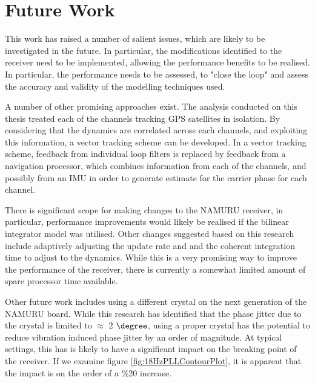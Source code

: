
\section{Future Work}
This work has raised a number of salient issues, which are likely to be investigated in the future. In particular, the modifications identified to the receiver need to be implemented, allowing the performance benefits to be realised. In particular, the performance needs to be assessed, to "close the loop" and assess the accuracy and validity of the modelling techniques used.

A number of other promising approaches exist. The analysis conducted on this thesis treated each of the channels tracking GPS satellites in isolation. By considering that the dynamics are correlated across each channels, and exploiting this information, a vector tracking scheme can be developed. In a vector tracking scheme, feedback from individual loop filters is replaced by feedback from a navigation processor, which combines information from each of the channels, and possibly from an IMU in order to generate estimate for the carrier phase for each channel. 

There is significant scope for making changes to the \ac{NAMURU} receiver, in particular, performance improvements would likely be realised if the bilinear integrator model was utilised. Other changes suggested based on this research include adaptively adjusting the update rate and and the coherent integration time to adjust to the dynamics. While this is a very promising way to improve the performance of the receiver, there is currently a somewhat limited amount of spare processor time available. 

Other future work includes using a different crystal on the next generation of the NAMURU board. While this research has identified that the phase jitter due to the crystal is limited to $\approx$ 2 $\degree$, using a proper crystal has the potential to reduce vibration induced phase jitter by an order of magnitude. At typical settings, this has is likely to have a significant impact on the breaking point of the receiver. If we examine figure \ref{fig:18HzPLLContourPlot}, it is apparent that the impact is on the order of a \%20 increase.











